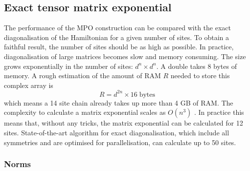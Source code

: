
\subsection{Exact tensor matrix exponential } \label{chap_bench}

The performance of the \Gls{MPO} construction can be compared with the exact diagonalisation of the Hamiltonian for a given number of sites. To obtain a faithful result, the number of sites should be as high as possible. In practice, diagonalisation of large matrices becomes slow and memory consuming. The size grows exponentially in the number of sites: $d^{n} \times d^{n} $. A double takes 8 bytes of memory. A rough estimation of the amount of RAM $R$ needed to store this complex array is
\begin{equation}
    R = d^{2 n} \times 16 \; \text{bytes}
\end{equation}
which means a 14 site chain already takes up more than 4 GB of RAM. The complexity to calculate a matrix exponential scales as $O(n^3)$ \cite{Moler2003}. In practice this means that, without any tricks, the matrix exponential can be calculated for 12 sites.  State-of-the-art algorithm for exact diagonalisation, which include all symmetries and are optimised for parallelisation, can calculate up to 50 sites. \cite{Wietek2018}

\subsubsection{Norms} \label{mponormdef}

